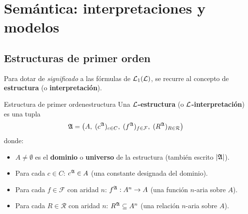 \section{Semántica: interpretaciones y modelos}

\subsection{Estructuras de primer orden}

Para dotar de \emph{significado} a las fórmulas de $\mathcal{L}_1(\mathcal{L})$, se recurre al concepto de \textbf{estructura} (o \textbf{interpretación}).

\begin{definicion}{Estructura de primer orden}{estructura}
Una \textbf{$\mathcal{L}$-estructura} (o \textbf{$\mathcal{L}$-interpretación}) es una tupla
\[
  \mathfrak{A} = \bigl(A,\; (c^{\mathfrak{A}})_{c \in C},\; (f^{\mathfrak{A}})_{f \in \mathcal{F}},\; (R^{\mathfrak{A}})_{R \in \mathcal{R}}\bigr)
\]
donde:
\begin{itemize}[leftmargin=2em]
  \item $A \neq \emptyset$ es el \textbf{dominio} o \textbf{universo} de la estructura (también escrito $|\mathfrak{A}|$).
  \item Para cada $c \in C$: $c^{\mathfrak{A}} \in A$ (una constante designada del dominio).
  \item Para cada $f \in \mathcal{F}$ con aridad $n$: $f^{\mathfrak{A}} : A^n \to A$ (una función $n$-aria sobre $A$).
  \item Para cada $R \in \mathcal{R}$ con aridad $n$: $R^{\mathfrak{A}} \subseteq A^n$ (una relación $n$-aria sobre $A$).
\end{itemize}
\end{definicion}

